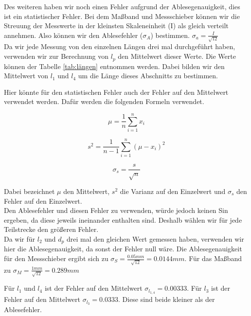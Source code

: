 \documentclass[twoside]{protokoll}
\begin{document}
Des weiteren haben wir noch einen Fehler aufgrund der Ablesegenauigkeit, dies ist ein statistischer Fehler.
Bei dem Maßband und Messschieber können wir die Streuung der Messwerte in der kleinsten Skaleneinheit (I) als gleich verteilt annehmen. 
Also können wir den Ablesefehler ($\sigma_A$) bestimmen. $\sigma_a = \frac{I}{\sqrt{12}}$\\

Da wir jede Messung von den einzelnen Längen drei mal durchgeführt haben, verwenden wir zur Berechnung von $l_p$ den Mittelwert dieser Werte. 
Die Werte können der Tabelle \ref{tab:längen} entnommen werden. 
Dabei bilden wir den Mittelwert von $l_1$ und $l_4$ um die Länge dieses Abschnitts zu bestimmen.

Hier könnte für den statistischen Fehler auch der Fehler auf den Mittelwert verwendet werden. 
Dafür werden die folgenden Formeln verwendet. 

\begin{equation}
	\mu = \frac{1}{n}\sum_{i=1}^nx_i
\end{equation}

\begin{equation}
	s^2 = \frac{1}{n-1}\sum_{i=1}^n(\mu-x_i)^2
\end{equation}

\begin{equation}
	\sigma_s = \frac{s}{\sqrt{n}} 
\end{equation}

Dabei bezeichnet $\mu$ den Mittelwert, $s^2$ die Varianz auf den Einzelwert und $\sigma_s$ den Fehler auf den Einzelwert.\\

Den Ablesefehler und diesen Fehler zu verwenden, würde jedoch keinen Sin ergeben, da diese jeweils ineinander enthalten sind. 
Deshalb wählen wir für jede Teilstrecke den größeren Fehler. \\

Da wir für $l_2$ und $d_p$ drei mal den gleichen Wert gemessen haben, verwenden wir hier die Ablesegenauigkeit, da sonst der Fehler null wäre.
Die Ablesegenauigkeit für den Messschieber ergibt sich zu $\sigma_S = \frac{0.05mm}{\sqrt{12}} = 0.0144mm $. Für das Maßband zu $\sigma_M = \frac{1mm}{\sqrt{12}} = 0.289mm$

Für $l_1$ und $l_4$ ist der Fehler auf den Mittelwert $\sigma_{l_{1,4}} = 0.00333$.
Für $l_3$ ist der Fehler auf den Mittelwert $ \sigma_{l_3} = 0.0333$.
Diese sind beide kleiner als der Ablesefehler.\\
\end{document}
